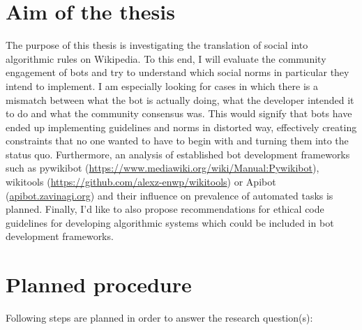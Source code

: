 \documentclass[pdftex,a4paper,11pt]{scrartcl}
\begin{document}

\section{Aim of the thesis}
The purpose of this thesis is investigating the translation of social into algorithmic rules on Wikipedia.
To this end, I will evaluate the community engagement of bots and try to understand which social norms in particular they intend to implement.
I am especially looking for cases in which there is a mismatch between what the bot is actually doing, what the developer intended it to do and what the community consensus was.
This would signify that bots have ended up implementing guidelines and norms in distorted way, effectively creating constraints that no one wanted to have to begin with and turning them into the status quo.
Furthermore, an analysis of established bot development frameworks such as pywikibot (\url{https://www.mediawiki.org/wiki/Manual:Pywikibot}), wikitools (\url{https://github.com/alexz-enwp/wikitools}) or Apibot (\url{apibot.zavinagi.org}) and their influence on prevalence of automated tasks is planned.
Finally, I'd like to also propose recommendations for ethical code guidelines for developing algorithmic systems which could be included in bot development frameworks.


\section{Planned procedure}

Following steps are planned in order to answer the research question(s):
\end{document}
